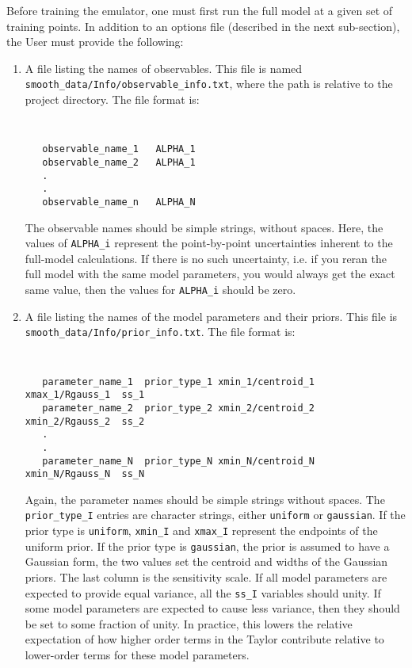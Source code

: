 \documentclass[UserManual.tex]{subfiles}
\begin{document}
Before training the emulator, one must first run the full model at a given set of training points. In addition to an options file (described in the next sub-section), the User must provide the following:
\begin{enumerate}\itemsep=0pt
\item A file listing the names of observables. This file is named\\{\tt smooth\_data/Info/observable\_info.txt}, where the path is relative to the project directory. The file format is:\\
{\tt
\begin{verbatim}
   observable_name_1   ALPHA_1
   observable_name_2   ALPHA_1
   .
   .
   observable_name_n   ALPHA_N\end{verbatim}
}
The observable names should be simple strings, without spaces. Here, the values of {\tt ALPHA\_i} represent the point-by-point uncertainties inherent to the full-model calculations. If there is no such uncertainty, i.e. if you reran the full model with the same model parameters, you would always get the exact same value, then the values for {\tt ALPHA\_i} should be zero.

\item A file listing the names of the model parameters and their priors. This file is {\tt smooth\_data/Info/prior\_info.txt}. The file format is:\\
{\tt
\begin{verbatim}
   parameter_name_1  prior_type_1 xmin_1/centroid_1  xmax_1/Rgauss_1  ss_1
   parameter_name_2  prior_type_2 xmin_2/centroid_2  xmin_2/Rgauss_2  ss_2
   .
   .
   parameter_name_N  prior_type_N xmin_N/centroid_N  xmin_N/Rgauss_N  ss_N
   \end{verbatim}
 }
Again, the parameter names should be simple strings without spaces. The {\tt prior\_type\_I} entries are character strings, either {\tt uniform} or {\tt gaussian}. If the prior type is {\tt uniform}, {\tt xmin\_I} and {\tt xmax\_I} represent the endpoints of the uniform prior. If the prior type is {\tt gaussian}, the prior is assumed to have a Gaussian form, the two values set the centroid and widths of the Gaussian priors. The last column is the sensitivity scale. If all model parameters are expected to provide equal variance, all the {\tt ss\_I} variables should unity. If some model parameters are expected to cause less variance, then they should be set to some fraction of unity. In practice, this lowers the relative expectation of how higher order terms in the Taylor contribute relative to lower-order terms for these model parameters.


\end{enumerate}
\end{document}
